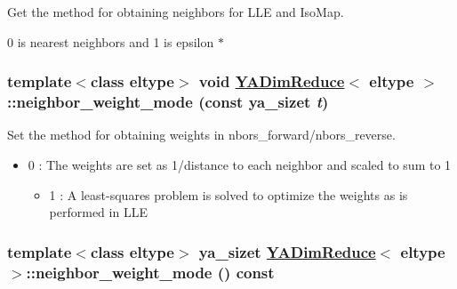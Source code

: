 Get the method for obtaining neighbors for LLE and Iso\-Map. 

0 is nearest neighbors and 1 is epsilon $\ast$ \hypertarget{class_y_a_dim_reduce_a28}{
\subsubsection[neighbor\_\-weight\_\-mode]{\setlength{\rightskip}{0pt plus 5cm}template$<$class eltype$>$ void \hyperlink{class_y_a_dim_reduce}{YADim\-Reduce}$<$ eltype $>$::neighbor\_\-weight\_\-mode (const ya\_\-sizet {\em t})}}
\label{class_y_a_dim_reduce_a28}


Set the method for obtaining weights in nbors\_\-forward/nbors\_\-reverse. 

\begin{itemize}
\item 0 : The weights are set as 1/distance to each neighbor and scaled to sum to 1\begin{itemize}
\item 1 : A least-squares problem is solved to optimize the weights as is performed in LLE 
\end{itemize}
\end{itemize}
\hypertarget{class_y_a_dim_reduce_a27}{
\subsubsection[neighbor\_\-weight\_\-mode]{\setlength{\rightskip}{0pt plus 5cm}template$<$class eltype$>$ ya\_\-sizet \hyperlink{class_y_a_dim_reduce}{YADim\-Reduce}$<$ eltype $>$::neighbor\_\-weight\_\-mode () const}}
\label{class_y_a_dim_reduce_a27}


